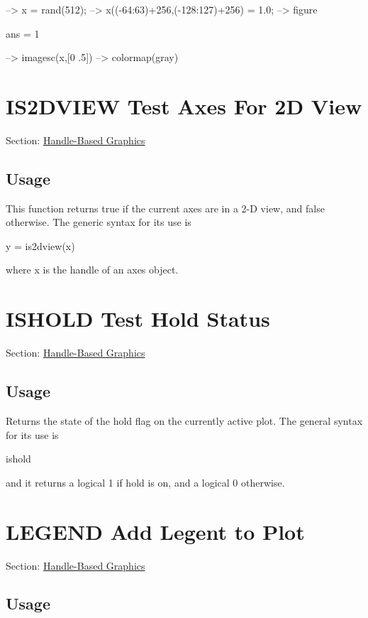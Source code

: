 \begin{DoxyVerbInclude}
--> x = rand(512);
--> x((-64:63)+256,(-128:127)+256) = 1.0;
--> figure

ans = 
 1 

--> imagesc(x,[0 .5])
--> colormap(gray)
\end{DoxyVerbInclude}
 \hypertarget{handle_is2dview}{}\section{I\-S2\-D\-V\-I\-E\-W Test Axes For 2\-D View}\label{handle_is2dview}
Section\-: \hyperlink{sec_handle}{Handle-\/\-Based Graphics} \hypertarget{vtkwidgets_vtkxyplotwidget_Usage}{}\subsection{Usage}\label{vtkwidgets_vtkxyplotwidget_Usage}
This function returns {\ttfamily true} if the current axes are in a 2-\/\-D view, and false otherwise. The generic syntax for its use is \begin{DoxyVerb}  y = is2dview(x)
\end{DoxyVerb}
 where {\ttfamily x} is the handle of an axes object. \hypertarget{handle_ishold}{}\section{I\-S\-H\-O\-L\-D Test Hold Status}\label{handle_ishold}
Section\-: \hyperlink{sec_handle}{Handle-\/\-Based Graphics} \hypertarget{vtkwidgets_vtkxyplotwidget_Usage}{}\subsection{Usage}\label{vtkwidgets_vtkxyplotwidget_Usage}
Returns the state of the {\ttfamily hold} flag on the currently active plot. The general syntax for its use is \begin{DoxyVerb}   ishold
\end{DoxyVerb}
 and it returns a logical 1 if {\ttfamily hold} is {\ttfamily on}, and a logical 0 otherwise. \hypertarget{handle_legend}{}\section{L\-E\-G\-E\-N\-D Add Legent to Plot}\label{handle_legend}
Section\-: \hyperlink{sec_handle}{Handle-\/\-Based Graphics} \hypertarget{vtkwidgets_vtkxyplotwidget_Usage}{}\subsection{Usage}\label{vtkwidgets_vtkxyplotwidget_Usage}
